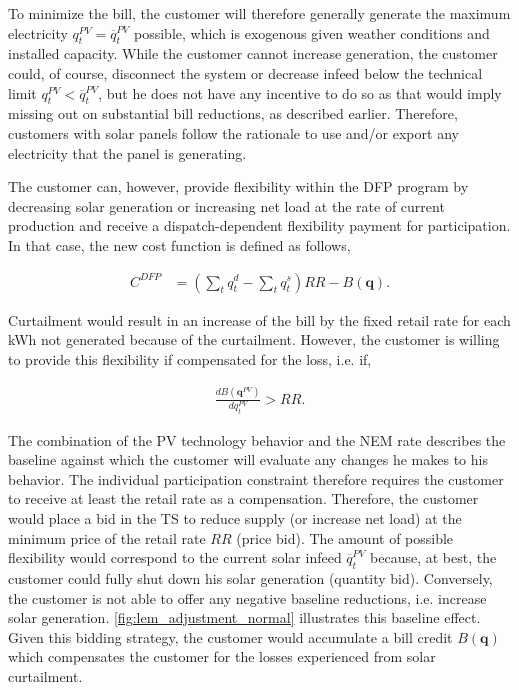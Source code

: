 \documentclass[12pt]{article}{Definitions/mdpi}
\begin{document}
To minimize the bill, the customer will therefore generally generate the maximum electricity $q^{PV}_t = \overline{q}^{PV}_t$ possible, which is exogenous given weather conditions and installed capacity.
While the customer cannot increase generation, the customer could, of course, disconnect the system or decrease infeed below the technical limit $q^{PV}_t < \overline{q}^{PV}_t$, but he does not have any incentive to do so as that would imply missing out on substantial bill reductions, as described earlier. 
Therefore, customers with solar panels follow the rationale to use and/or export any electricity that the panel is generating.

The customer can, however, provide flexibility within the DFP program by decreasing solar generation or increasing net load at the rate of current production and receive a dispatch-dependent flexibility payment for participation. In that case, the new cost function is defined as follows,

\begin{align}
    C^{DFP} &= (\sum_t q^d_t - \sum_t q^s_t) RR - B(\mathbf{q}).
\end{align}

Curtailment would result in an increase of the bill by the fixed retail rate for each kWh not generated because of the curtailment. However, the customer is willing to provide this flexibility if compensated for the loss, i.e. if,

\begin{align}
    \frac{d B(\mathbf{q}^{PV})}{d q^{PV}_t} > RR .
\end{align}

The combination of the PV technology behavior and the NEM rate describes the baseline against which the customer will evaluate any changes he makes to his behavior.
The individual participation constraint therefore requires the customer to receive at least the retail rate as a compensation. Therefore, the customer would place a bid in the TS to reduce supply (or increase net load) at the minimum price of the retail rate $RR$  (price bid).
The amount of possible flexibility would correspond to the current solar infeed $\overline{q}^{PV}_t$ because, at best, the customer could fully shut down his solar generation (quantity bid). Conversely, the customer is not able to offer any negative baseline reductions, i.e. increase solar generation. \cref{fig:lem_adjustment_normal} illustrates this baseline effect.
Given this bidding strategy, the customer would accumulate a bill credit $B(\mathbf{q})$ which compensates the customer for the losses experienced from solar curtailment.
\end{document}
